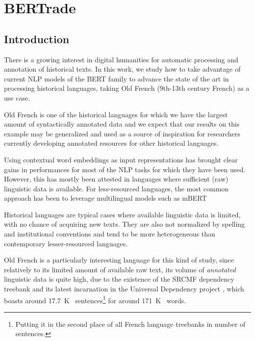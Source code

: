 \chapter{BERTrade}

\section{Introduction}
There is a growing interest in digital humanities for automatic processing and annotation of historical texts. In this work, we study how to take advantage of current NLP models of the BERT family to advance the state of the art in processing historical languages, taking Old French (9th-13th century French) as a use case.

Old French is one of the historical languages for which we have the largest amount of syntactically annotated data and we expect that our results on this example may be generalized and used as a source of inspiration for researchers currently developing annotated resources for other historical languages.

Using contextual word embeddings as input representations has brought clear gains in performances for most of the NLP tasks for which they have been used.
However, this has mostly been attested in languages where sufficient (raw) linguistic data is available.
For less-resourced languages, the most common approach has been to leverage multilingual models such as mBERT \citep{devlin-etal-2019-bert}

Historical languages are typical cases where available linguistic data is limited, with no chance of acquiring new texts. They are also not normalized by spelling and institutional conventions and tend to be more heterogeneous than contemporary lesser-resourced languages.

Old French is a particularly interesting language for this kind of study, since relatively to its limited amount of available raw text, its volume of \emph{annotated} linguistic data is quite high, due to the existence of the SRCMF dependency treebank \citep{prevost-stein-2013-syntactic} and its latest incarnation in the Universal Dependency project \citep{nivre-etal-2020-universal}, which boasts around \SI{17.7}{K\quantity} sentences\footnote{Putting it in the second place of all French language treebanks in number of sentences.} for around \SI{171}{K\quantity} words.

